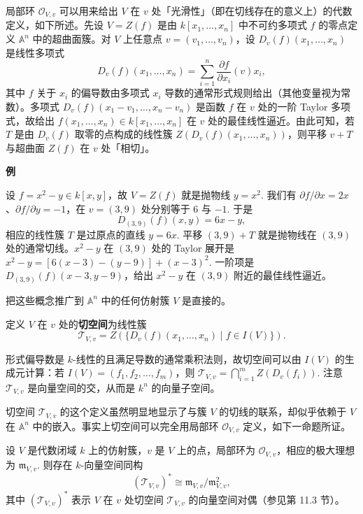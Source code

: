 局部环 \(\mathcal{O}_{V,v}\) 可以用来给出 \(V\) 在 \(v\) 处「光滑性」（即在切线存在的意义上）的代数定义，如下所述。先设 \(V = Z(f)\) 是由 \(k[x_1, \ldots, x_n]\) 中不可约多项式 \(f\) 的零点定义 \(\mathbb{A}^n\) 中的超曲面簇。对 \(V\) 上任意点 \(v = (v_1, \ldots, v_n)\)，设 \(D_v(f)(x_1, \ldots, x_n)\) 是线性多项式
\[
D_v(f)(x_1, \ldots, x_n) = \sum_{i=1}^{n}\frac{\partial f}{\partial x_i}(v)x_i,
\]
其中 \(f\) 关于 \(x_i\) 的偏导数由多项式 \(x_i\) 导数的通常形式规则给出（其他变量视为常数）。多项式 \(D_v(f)(x_1-v_1, \ldots, x_n-v_n)\) 是函数 \(f\) 在 \(v\) 处的一阶 Taylor 多项式，故给出 \(f(x_1, \ldots, x_n) \in k[x_1, \ldots, x_n]\) 在 \(v\) 处的最佳线性逼近。由此可知，若 \(T\) 是由 \(D_v(f)\) 取零的点构成的线性簇 \(Z(D_v(f)(x_1, \ldots, x_n))\)，则平移 \(v+T\) 与超曲面 \(Z(f)\) 在 \(v\) 处「相切」。

\noindent\textbf{例}

设 \(f = x^2-y \in k[x,y]\)，故 \(V = Z(f)\) 就是抛物线 \(y = x^2\). 我们有 \(\partial f/\partial x = 2x\)、\(\partial f/\partial y = -1\)，在 \(v = (3,9)\) 处分别等于 6 与 \(-1\). 于是
\[
D_{(3,9)}(f)(x,y) = 6x-y,
\]
相应的线性簇 \(T\) 是过原点的直线 \(y = 6x\). 平移 \((3,9)+T\) 就是抛物线在 \((3,9)\) 处的通常切线。\(x^2-y\) 在 \((3,9)\) 处的 Taylor 展开是 \(x^2-y = [6(x-3)-(y-9)]+(x-3)^2\). 一阶项是 \(D_{(3,9)}(f)(x-3, y-9)\)，给出 \(x^2-y\) 在 \((3,9)\) 附近的最佳线性逼近。

把这些概念推广到 \(\mathbb{A}^n\) 中的任何仿射簇 \(V\) 是直接的。

\begin{definition}
定义 \(V\) 在 \(v\) 处的\textbf{切空间}为线性簇
\[
\mathcal{T}_{V,v} = Z\left(\{D_v(f)(x_1, \ldots, x_n) \mid f \in I(V)\}\right).
\]
\end{definition}

形式偏导数是 \(k\)-线性的且满足导数的通常乘积法则，故切空间可以由 \(I(V)\) 的生成元计算：若 \(I(V) = (f_1, f_2, \ldots, f_m)\)，则 \(\mathcal{T}_{V,v} = \bigcap_{i=1}^{m}Z(D_v(f_i))\). 注意 \(\mathcal{T}_{V,v}\) 是向量空间的交，从而是 \(k^n\) 的向量子空间。

切空间 \(\mathcal{T}_{V,v}\) 的这个定义虽然明显地显示了与簇 \(V\) 的切线的联系，却似乎依赖于 \(V\) 在 \(\mathbb{A}^n\) 中的嵌入。事实上切空间可以完全用局部环 \(\mathcal{O}_{V,v}\) 定义，如下一命题所证。

\begin{proposition}\label{pro:15.52}
设 \(V\) 是代数闭域 \(k\) 上的仿射簇，\(v\) 是 \(V\) 上的点，局部环为 \(\mathcal{O}_{V,v}\)，相应的极大理想为 \(\mathfrak{m}_{V,v}\). 则存在 \(k\)-向量空间同构
\[
(\mathcal{T}_{V,v})^* \cong \mathfrak{m}_{V,v}/\mathfrak{m}_{V,v}^2,
\]
其中 \((\mathcal{T}_{V,v})^*\) 表示 \(V\) 在 \(v\) 处切空间 \(\mathcal{T}_{V,v}\) 的向量空间对偶（参见第 11.3 节）。
\end{proposition}

